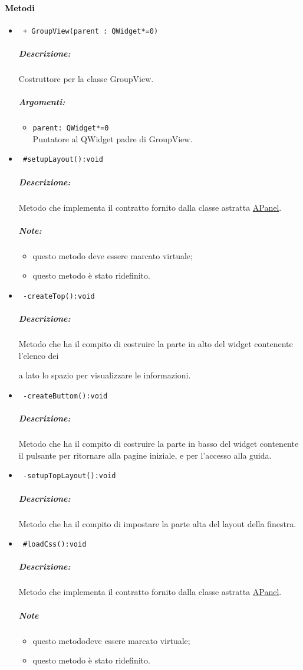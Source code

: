 \paragraph{\textcolor{black}{Metodi\\}}
\begin{itemize}
\item\color{blue}\verb! + GroupView(parent : QWidget*=0)!
\color{black}
\subparagraph{Descrizione:}Costruttore per la classe GroupView. 
\subparagraph{Argomenti:}
\begin{itemize}
\item \color{RoyalPurple}\verb!parent: QWidget*=0!  \\ Puntatore al QWidget padre di GroupView.
\end{itemize}

\item\color{blue}\verb! #setupLayout():void!
\color{black}
\subparagraph{Descrizione:}Metodo che implementa il contratto fornito dalla classe astratta \hyperref[speAPanel]{APanel}.
\subparagraph{Note:}
\begin{itemize}
\item questo metodo deve essere marcato virtuale;
\item questo metodo è stato ridefinito.
\end{itemize}
 
\item\color{blue}\verb! -createTop():void!
\color{black}
\subparagraph{Descrizione:}Metodo che ha il compito di costruire la parte in alto del widget contenente l'elenco dei \subject e a lato lo spazio per visualizzare le informazioni.
 
\item\color{blue}\verb! -createButtom():void!
\color{black}
\subparagraph{Descrizione:}Metodo che ha il compito di costruire la parte in basso del widget contenente il pulsante per ritornare alla pagine iniziale, e per l'accesso alla guida.

\item\color{blue}\verb! -setupTopLayout():void!
\color{black}
\subparagraph{Descrizione:} Metodo che ha il compito di impostare la parte alta del layout della finestra.
  
\item\color{blue}\verb! #loadCss():void!
\color{black}
\subparagraph{Descrizione:} Metodo che implementa il contratto fornito dalla classe astratta \hyperref[speAPanel]{APanel}.
 \subparagraph{Note}
 \begin{itemize}
  \item questo metododeve essere marcato virtuale;
 \item questo metodo è stato ridefinito.
 \end{itemize}
 

\end{itemize}
